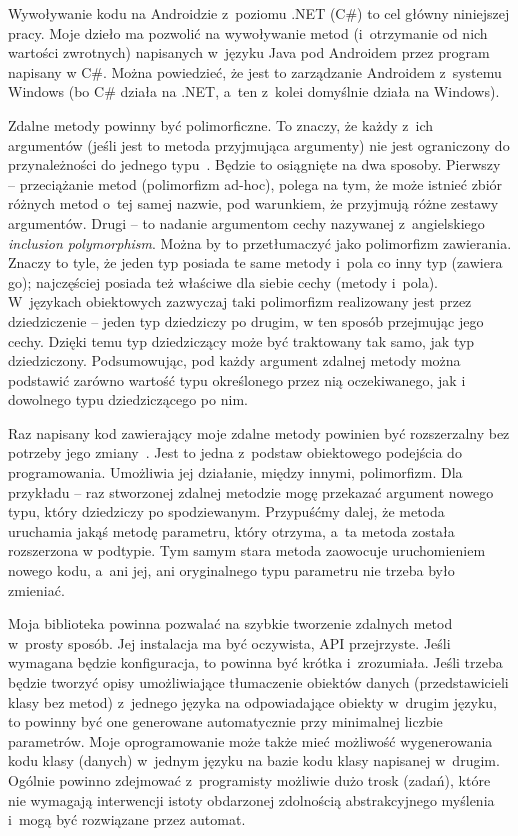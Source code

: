 \begin{description}
Wywoływanie kodu na Androidzie z~poziomu .NET (C\#) to cel główny niniejszej pracy. Moje dzieło ma pozwolić na wywoływanie metod (i~otrzymanie od nich wartości zwrotnych) napisanych w~języku Java pod Androidem przez program napisany w C\#. Można powiedzieć, że jest to zarządzanie Androidem z~systemu Windows (bo C\# działa na .NET, a~ten z~kolei domyślnie działa na Windows).

Zdalne metody powinny być polimorficzne. To znaczy, że każdy z~ich argumentów (jeśli jest to metoda przyjmująca argumenty) nie jest ograniczony do przynależności do jednego typu~\cite{polymorphism}. Będzie to osiągnięte na dwa sposoby. Pierwszy -- przeciążanie metod (polimorfizm ad-hoc), polega na tym, że może istnieć zbiór różnych metod o~tej samej nazwie, pod warunkiem, że przyjmują różne zestawy argumentów. Drugi -- to nadanie argumentom cechy nazywanej z~angielskiego \emph{inclusion polymorphism}. Można by to przetłumaczyć jako polimorfizm zawierania. Znaczy to tyle, że jeden typ posiada te same metody i~pola co inny typ (zawiera go); najczęściej posiada też właściwe dla siebie cechy (metody i~pola). W~językach obiektowych zazwyczaj taki polimorfizm realizowany jest przez dziedziczenie -- jeden typ dziedziczy po drugim, w ten sposób przejmując jego cechy. Dzięki temu typ dziedziczący może być traktowany tak samo, jak typ dziedziczony. Podsumowując, pod każdy argument zdalnej metody można podstawić zarówno wartość typu określonego przez nią oczekiwanego, jak i dowolnego typu dziedziczącego po nim.

Raz napisany kod zawierający moje zdalne metody powinien być rozszerzalny bez potrzeby jego zmiany~\cite[str.~105]{design-patterns}. Jest to jedna z~podstaw obiektowego podejścia do programowania. Umożliwia jej działanie, między innymi, polimorfizm. Dla przykładu -- raz stworzonej zdalnej metodzie mogę przekazać argument nowego typu, który dziedziczy po spodziewanym. Przypuśćmy dalej, że metoda uruchamia jakąś metodę parametru, który otrzyma, a~ta metoda została rozszerzona w podtypie. Tym samym stara metoda zaowocuje uruchomieniem nowego kodu, a~ani jej, ani oryginalnego typu parametru nie trzeba było zmieniać.

Moja biblioteka powinna pozwalać na szybkie tworzenie zdalnych metod w~prosty sposób. Jej instalacja ma być oczywista, API przejrzyste. Jeśli wymagana będzie konfiguracja, to powinna być krótka i~zrozumiała. Jeśli trzeba będzie tworzyć opisy umożliwiające tłumaczenie obiektów danych (przedstawicieli klasy bez metod) z~jednego języka na odpowiadające obiekty w~drugim języku, to powinny być one generowane automatycznie przy minimalnej liczbie parametrów. Moje oprogramowanie może także mieć możliwość wygenerowania kodu klasy (danych) w~jednym języku na bazie kodu klasy napisanej w~drugim. Ogólnie powinno zdejmować z~programisty możliwie dużo trosk (zadań), które nie wymagają interwencji istoty obdarzonej zdolnością abstrakcyjnego myślenia i~mogą być rozwiązane przez automat.


\end{description}
